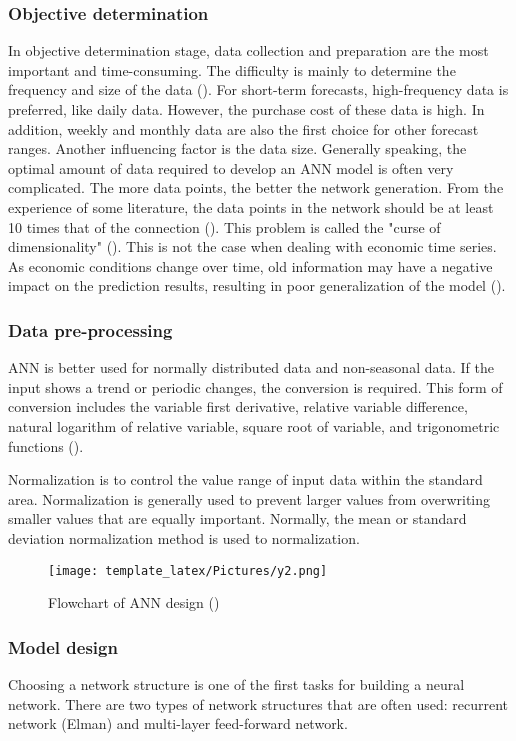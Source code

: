 \subsubsection{Objective determination}
In objective determination stage, data collection and preparation are the most important and time-consuming. The difficulty is mainly to determine the frequency and size of the data (\cite{Y4}). For short-term forecasts, high-frequency data is preferred, like daily data. However, the purchase cost of these data is high. In addition, weekly and monthly data are also the first choice for other forecast ranges. Another influencing factor is the data size. Generally speaking, the optimal amount of data required to develop an ANN model is often very complicated. The more data points, the better the network generation. From the experience of some literature, the data points in the network should be at least 10 times that of the connection (\cite{Y5}). This problem is called the "curse of dimensionality" (\cite{Y2}). This is not the case when dealing with economic time series. As economic conditions change over time, old information may have a negative impact on the prediction results, resulting in poor generalization of the model (\cite{Y4}).

\subsubsection{Data pre-processing}

ANN is better used for normally distributed data and non-seasonal data. If the input shows a trend or periodic changes, the conversion is required. This form of conversion includes the variable first derivative, relative variable difference, natural logarithm of relative variable, square root of variable, and trigonometric functions (\cite{Y2}).

Normalization is to control the value range of input data within the standard area. Normalization is generally used to prevent larger values from overwriting smaller values that are equally important. Normally, the mean or standard deviation normalization method is used to normalization.
\begin{figure}[h]
    \centering
    \texttt{[image: template\_latex/Pictures/y2.png]}
    \caption{Flowchart of ANN design (\cite{Y1})}
    \label{y2}
\end{figure}
\subsubsection{Model design}
Choosing a network structure is one of the first tasks for building a neural network. There are two types of network structures that are often used: recurrent network (Elman) and multi-layer feed-forward network.

